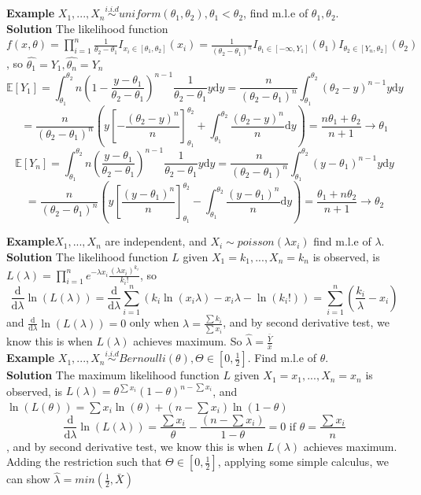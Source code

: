 \documentclass[a4paper,12pt]{article}
\begin{document}
\textbf{Example}  $X_1, ..., X_n \overset{i.i.d}{\sim} uniform(\theta_1, \theta_2), \theta_1 < \theta_2$, find m.l.e of $\theta_1, \theta_2$.\\

\textbf{Solution} The likelihood function $f(x, \theta) = \prod_{i=1}^n \frac{1}{\theta_2 - \theta_1}I_{x_i\in[\theta_1, \theta_2]}(x_i) = \frac{1}{(\theta_2 - \theta_1)^n}I_{\theta_1\in[-\infty, Y_1]}(\theta_1)I_{\theta_2\in[Y_n, \theta_2]}(\theta_2) $, so $\hat{\theta_1} = Y_1, \hat{\theta_n} = Y_n$\\
$$\mathbb{E}[Y_1] = \int_{\theta_1}^{\theta_2} n(1-\frac{y-\theta_1}{\theta_2-\theta_1})^{n-1}\frac{1}{\theta_2-\theta_1}y \mathrm{d}y = \frac{n}{(\theta_2-\theta_1)^n}\int_{\theta_1}^{\theta_2} (\theta_2-y)^{n-1}y\mathrm{d}y$$
$$= \frac{n}{(\theta_2-\theta_1)^n}( y[-\frac{(\theta_2-y)^n}{n}]_{\theta_1}^{\theta_2} + \int_{\theta_1}^{\theta_2}\frac{(\theta_2-y)^n}{n}\mathrm{d}y) = \frac{n\theta_1+\theta_2}{n+1}\to\theta_1$$
$$\mathbb{E}[Y_n] = \int_{\theta_1}^{\theta_2} n(\frac{y-\theta_1}{\theta_2-\theta_1})^{n-1}\frac{1}{\theta_2-\theta_1}y \mathrm{d}y = \frac{n}{(\theta_2-\theta_1)^n}\int_{\theta_1}^{\theta_2} (y-\theta_1)^{n-1}y\mathrm{d}y$$
$$= \frac{n}{(\theta_2-\theta_1)^n}( y[\frac{(y-\theta_1)^n}{n}]_{\theta_1}^{\theta_2} - \int_{\theta_1}^{\theta_2}\frac{(y-\theta_1)^n}{n}\mathrm{d}y) = \frac{\theta_1+n\theta_2}{n+1}\to\theta_2$$

\textbf{Example}$X_1, ..., X_n  $ are independent, and $X_i\sim poisson(\lambda x_i)$ find m.l.e of $\lambda$.\\

\textbf{Solution} The likelihood function $L$ given $X_1 = k_1, ..., X_n = k_n$ is observed, is $L(\lambda) = \prod_{i=1}^n e^{-\lambda x_i}\frac{(\lambda x_i)^{k_i}}{k_i!}$, so 
$$\frac{\mathrm{d}}{\mathrm{d}\lambda}\ln(L(\lambda)) = \frac{\mathrm{d}}{\mathrm{d}\lambda}\sum_{i=1}^n (k_i\ln(x_i\lambda)-x_i\lambda-\ln(k_i!)) = \sum_{i=1}^n(\frac{k_i}{\lambda}-x_i)$$ and $\frac{\mathrm{d}}{\mathrm{d}\lambda}\ln(L(\lambda)) = 0$ only when $\lambda = \frac{\sum k_i}{\sum x_i}$, and by second derivative test, we know this is when $L(\lambda)$ achieves maximum. So $\hat{\lambda} = \frac{\bar{Y}}{\bar{x}}$\\

\textbf{Example} $X_1, ..., X_n \overset{i.i.d}{\sim} Bernoulli(\theta), \Theta \in [0, \frac{1}{2}]$. Find m.l.e of $\theta$.\\

\textbf{Solution} The maximum likelihood function $L$ given $X_1 = x_1, ..., X_n = x_n$ is observed, is $L(\lambda) = \theta^{\sum x_i} (1-\theta)^{n-\sum x_i}$, and $\ln(L(\theta)) = \sum x_i \ln(\theta) + (n-\sum x_i)\ln(1-\theta)$
$$\frac{\mathrm{d}}{\mathrm{d}\lambda}\ln(L(\lambda)) = \frac{\sum x_i}{\theta} - \frac{(n-\sum x_i)}{1-\theta} = 0 \text{ if } \theta = \frac{\sum x_i}{n}$$
, and by second derivative test, we know this is when $L(\lambda)$ achieves maximum. Adding the restriction such that $\Theta \in [0, \frac{1}{2}]$, applying some simple calculus, we can show $\hat{\lambda} = min( \frac{1}{2}, \bar{X} )$
\\
\end{document}
